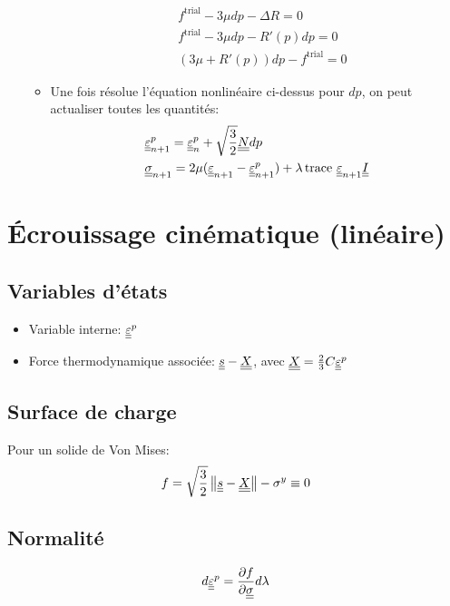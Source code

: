 \documentclass[11pt]{article}
\begin{document}
\begin{itemize}
\begin{itemize}
\begin{align}
      & f^{\text{trial}}  - 3\mu  dp   - \Delta R =0 \\
      & f^{\text{trial}}  - 3\mu  dp   - R'(p)dp =0 \\
      & (3\mu +R'(p))dp -f^{\text{trial}}=0
    \end{align}
  \item[(e)] Une fois résolue l'équation nonlinéaire ci-dessus pour $dp$, on peut actualiser toutes les quantités:
    \begin{align}
      & {\underline{\underline{\varepsilon}}}_{n+1}^p = {\underline{\underline{\varepsilon}}}_{n}^p + \sqrt{\frac{3}{2}}{\underline{\underline{N}}}dp\\
      & {\underline{\underline{\sigma}}}_{n+1}=2\mu ({\underline{\underline{\varepsilon}}}_{n+1}-{\underline{\underline{\varepsilon}}}^p_{n+1}) + \lambda \operatorname{trace \,}{{\underline{\underline{\varepsilon}}}_{n+1}}{\underline{\underline{I}}} 
    \end{align}
  \end{itemize}
\end{itemize}

\section{{\'E}crouissage cinématique (lin{\'e}aire)}
\label{sec:ecrouissage-isotrope}

\subsection{Variables d'{\'e}tats}


\begin{itemize}
\item Variable interne: ${\underline{\underline{\varepsilon}}}^p$
\item Force thermodynamique associée: ${\underline{\underline{s}}}-{\underline{\underline{X}}}$, avec ${\underline{\underline{X}}}=\frac{2}{3}C{\underline{\underline{\varepsilon}}}^p$
\end{itemize}

\subsection{Surface de charge}


Pour un solide de Von Mises:
\begin{equation}
  \label{eq:kinematic_hardening_yield_surface}
  f = \sqrt{\frac{3}{2}}\left\Vert{\underline{\underline{s}}}-{\underline{\underline{X}}}\right\Vert - \sigma^y  \equiv 0
\end{equation}

\subsection{Normalit{\'e}}


\begin{equation}
  d\tens{\eps}^p = \drond{f}{\tens{\sigma}} d\lambda %
\end{equation}
\end{document}
